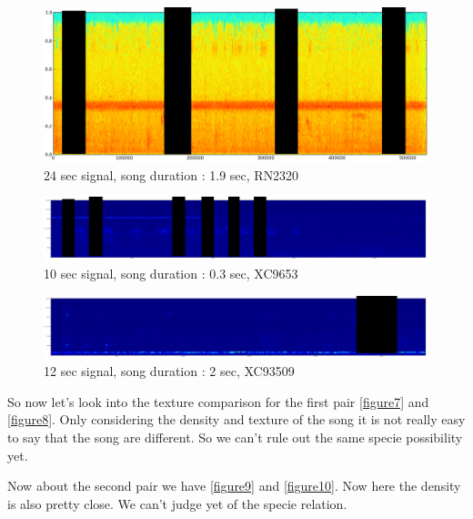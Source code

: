 \documentclass[a4paper]{article}
\begin{document}
\begin{figure}[H]
\begin{center}
\includegraphics[scale=0.2]{RN2320.png}\caption{24 sec signal, song duration : 1.9 sec, RN2320}\label{figure4}
\end{center}
\end{figure}


\begin{figure}[H]
\begin{center}
\includegraphics[scale=0.2]{XC9653.png}\caption{10 sec signal, song duration : 0.3 sec, XC9653}\label{figure5}
\end{center}
\end{figure}



\begin{figure}[H]
\begin{center}
\includegraphics[scale=0.2]{XC93509.png}\caption{12 sec signal, song duration : 2 sec, XC93509}\label{figure6}
\end{center}
\end{figure}

So now let's look into the texture comparison for the first pair  \ref{figure7} and \ref{figure8}. Only considering the density and texture of the song it is not really easy to say that the song are different. So we can't rule out the same specie possibility yet.

Now about the second pair we have \ref{figure9} and \ref{figure10}. Now here the density is also pretty close. We can't judge yet of the specie relation.
\end{document}
